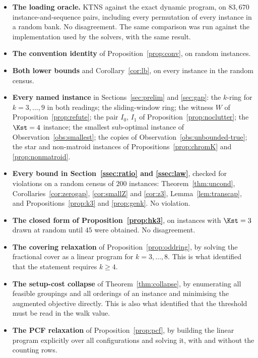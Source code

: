 \begin{itemize}[topsep=4pt,itemsep=2pt]
  \item \textbf{The loading oracle.} KTNS against the exact dynamic program, on
  $83{,}670$ instance-and-sequence pairs, including every permutation of every instance
  in a random bank. No disagreement. The same comparison was run against the
  implementation used by the solvers, with the same result.
  \item \textbf{The convention identity} of Proposition~\ref{prop:conv}, on random
  instances.
  \item \textbf{Both lower bounds} and Corollary~\ref{cor:lb}, on every instance in the
  random census.
  \item \textbf{Every named instance} in Sections~\ref{sec:prelim} and \ref{sec:gap}:
  the $k$-ring for $k=3,\dots,9$ in both readings; the sliding-window ring; the
  witness $W$ of Proposition~\ref{prop:refute}; the pair $I_0$, $I_1$ of
  Proposition~\ref{prop:noclutter}; the $\Kst=4$ instance; the smallest sub-optimal
  instance of Observation~\ref{obs:smallest}; the copies of
  Observation~\ref{obs:unbounded-true}; the star and non-matroid instances of
  Propositions~\ref{prop:chromK} and \ref{prop:nonmatroid}.
  \item \textbf{Every bound in Section~\ref{ssec:ratio} and \ref{ssec:law}}, checked
  for violations on a random census of $200$ instances: Theorem~\ref{thm:uncond},
  Corollaries~\ref{cor:zerogap}, \ref{cor:smallZ} and \ref{cor:z3},
  Lemma~\ref{lem:transcap}, and Propositions~\ref{prop:k3} and \ref{prop:genk}. No
  violation.
  \item \textbf{The closed form of Proposition~\ref{prop:hk3}}, on instances with
  $\Kst=3$ drawn at random until $45$ were obtained. No disagreement.
  \item \textbf{The covering relaxation} of Proposition~\ref{prop:oddring}, by solving
  the fractional cover as a linear program for $k=3,\dots,8$. This is what identified
  that the statement requires $k\ge4$.
  \item \textbf{The setup-cost collapse} of Theorem~\ref{thm:collapse}, by enumerating
  all feasible groupings and all orderings of an instance and minimising the augmented
  objective directly. This is also what identified that the threshold must be read in
  the walk value.
  \item \textbf{The PCF relaxation} of Proposition~\ref{prop:pcf}, by building the
  linear program explicitly over all configurations and solving it, with and without
  the counting rows.
\end{itemize}


